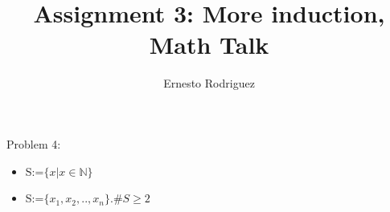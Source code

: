 \documentclass{article}
\title{Assignment 3: More induction, Math Talk}
\author{Ernesto Rodriguez}
\begin{document}
\maketitle

Problem 4:

\begin{itemize}

\item{S:=$\{x|x \in \mathbb{N}\}$}
\item{S:=$\{x_1,x_2,..,x_n\}.\#S \ge 2$}
\end{itemize}
\end{document}
